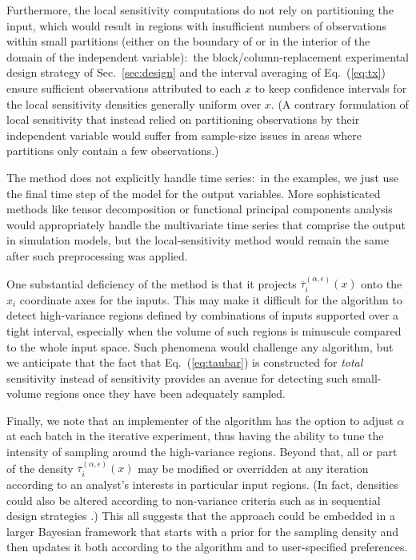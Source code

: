 \documentclass[12pt]{article}
\begin{document}
Furthermore, the local sensitivity computations do not rely on partitioning the input, which would result in regions with insufficient numbers of observations within small partitions (either on the boundary of or in the interior of the domain of the independent variable):\ the block/column-replacement experimental design strategy of Sec.~\ref{sec:design} and the interval averaging of Eq.~(\ref{eq:tx}) ensure sufficient observations attributed to each $x$ to keep confidence intervals for the local sensitivity densities generally uniform over $x$. (A contrary formulation of local sensitivity that instead relied on partitioning observations by their independent variable would suffer from sample-size issues in areas where partitions only contain a few observations.)

The method does not explicitly handle time series:\ in the examples, we just use the final time step of the model for the output variables. More sophisticated methods like tensor decomposition \citep{bugbee_enabling_2019} or functional principal components analysis \citep{ramsay_functional_2013} would appropriately handle the multivariate time series that comprise the output in simulation models, but the local-sensitivity method would remain the same after such preprocessing was applied.

One substantial deficiency of the method is that it projects $\overline{\tau}_i^{(\alpha,\epsilon)}(x)$ onto the $x_i$ coordinate axes for the inputs. This may make it difficult for the algorithm to detect high-variance regions defined by combinations of inputs supported over a tight interval, especially when the volume of such regions is minuscule compared to the whole input space. Such phenomena would challenge any algorithm, but we anticipate that the fact that Eq.~(\ref{eq:taubar}) is constructed for \textit{total} sensitivity instead of  sensitivity provides an avenue for detecting such small-volume regions once they have been adequately sampled.

Finally, we note that an implementer of the algorithm has the option to adjust $\alpha$ at each batch in the iterative experiment, thus having the ability to tune the intensity of sampling around the high-variance regions. Beyond that, all or part of the density $\overline{\tau}_i^{(\alpha,\epsilon)}(x)$ may be modified or overridden at any iteration according to an analyst's interests in particular input regions. (In fact, densities could also be altered according to non-variance criteria such as in sequential design strategies \citep{box_statistics_2005}.) This all suggests that the approach could be embedded in a larger Bayesian framework that starts with a prior for the sampling density and then updates it both according to the algorithm and to user-specified preferences.
\end{document}
